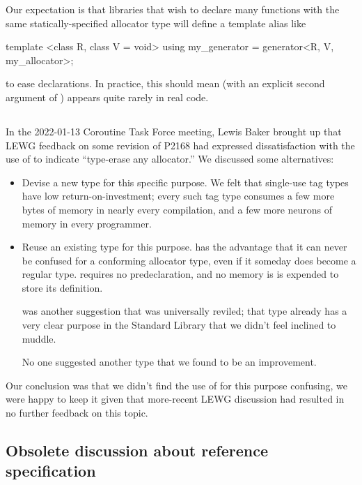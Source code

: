 \documentclass{wg21}
\begin{document}
Our expectation is that libraries that wish to declare
many functions with the same statically-specified allocator type
will define a template alias like
\begin{codeblock}
template <class R, class V = void>
using my_generator = generator<R, V, my_allocator>;
\end{codeblock}
to ease declarations.
In practice, this should mean 
(with an explicit second argument of )
appears quite rarely in real code.

\subsection{}

In the 2022-01-13 Coroutine Task Force meeting,
Lewis Baker brought up that LEWG feedback on some revision of P2168
had expressed dissatisfaction with the use of
 to indicate ``type-erase any allocator.''
We discussed some alternatives:
\begin{itemize}
\item Devise a new type for this specific purpose.
  We felt that single-use tag types have low return-on-investment;
  every such tag type consumes a few more bytes of memory
  in nearly every compilation, and a few more neurons of memory
  in every programmer.

\item Reuse an existing type for this purpose.
   has the advantage that it can never be confused for
  a conforming allocator type, even if it someday does become
  a regular type.
   requires no predeclaration, and
  no memory is is expended to store its definition.

   was another suggestion that was universally reviled;
  that type already has a very clear purpose in the Standard Library that
  we didn't feel inclined to muddle.

  No one suggested another type that we found to be an improvement.
\end{itemize}
Our conclusion was that we didn't find
the use of  for this purpose confusing,
we were happy to keep it given that more-recent LEWG discussion
had resulted in no further feedback on this topic.

\subsection{Obsolete discussion about reference specification}
\end{document}
